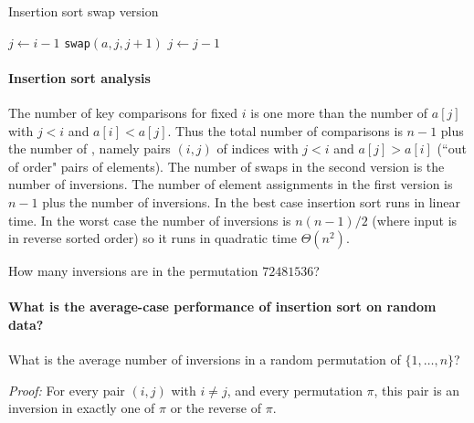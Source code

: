 \begin{algorithm}[H]
  \caption{Insertion sort swap version
    \label{alg:insort2}}
\begin{algorithmic}[1]
\State $j \gets i - 1$
\State {}
\State \texttt{swap}$(a,j,j+1)$
\State $j \gets j - 1$
\EndWhile
\EndFor
\State {}
\EndFunction  
\end{algorithmic}
\end{algorithm}

\paragraph{Insertion sort analysis}
The number of key comparisons for fixed $i$ is one more than the number of $a[j]$ with $j < i$ and $a[i] < a[j]$.
Thus the total number of comparisons is $n-1$ plus the number of , 
namely pairs $(i, j)$ of indices with $j < i$ and $a[j] > a[i]$ (``out of order" pairs of elements).
The number of swaps in the second version is the number of inversions. 
The number of element assignments in the first version is $n-1$ plus the number of inversions.
In the best case insertion sort runs in linear time. 
In the worst case the number of inversions is $n(n-1)/2$ 
(where input is in reverse sorted order) so it runs in quadratic time $\Theta(n^2)$.

\begin{Boxample}[4]
How many inversions are in the permutation $72481536$?
\end{Boxample}

\paragraph{What is the average-case performance of insertion sort on random data?}
\begin{Boxample}[6]
What is the average number of inversions in a random permutation of $\{1,\dots, n\}$?
\end{Boxample}
\textit{Proof:} For every pair $(i,j)$ with $i\neq j$,  and every permutation $\pi$, 
this pair is an inversion in exactly one of $\pi$ or the reverse of $\pi$.
\fi

